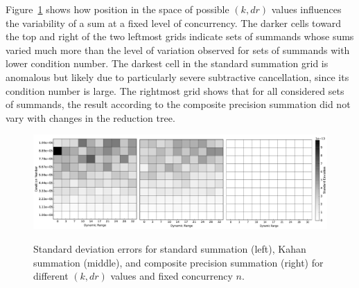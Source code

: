 Figure~\ref{fig:k_vs_dr} shows how position in the space of possible
$(k, dr)$ values influences the variability of a sum at a fixed level
of concurrency. The darker cells toward the top and right of the two
leftmost grids indicate sets of summands whose sums varied much more
than the level of variation observed for sets of summands with lower
condition number. The darkest cell in the standard summation grid is
anomalous but likely due to particularly severe subtractive
cancellation, since its condition number is large. The rightmost grid
shows that for all considered sets of summands, the result according
to the composite precision summation did not vary with changes in the
reduction tree.
\begin{figure}[!htb]
\centering
\includegraphics[width=\textwidth]{chapter_2_figures/fig_kvsDr.pdf} \\
\caption{Standard deviation errors for standard summation (left),
  Kahan summation (middle), and composite precision summation (right)
  for different $(k, dr)$ values and fixed concurrency $n$.}
\label{fig:k_vs_dr}
\end{figure}

